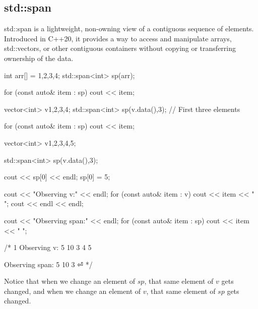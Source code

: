 \documentclass{report}
\begin{document}
         \subsection{std::span}
         \bigbreak \noindent 
         std::span is a lightweight, non-owning view of a contiguous sequence of elements. Introduced in C++20, it provides a way to access and manipulate arrays, std::vectors, or other contiguous containers without copying or transferring ownership of the data.
         \bigbreak \noindent 
         \begin{cppcode}
             int arr[] = {1,2,3,4};
             std::span<int> sp(arr);

             for (const auto& item : sp) cout << item;

             vector<int> v{1,2,3,4};
             std::span<int> sp(v.data(),3); // First three elements

             for (const auto& item : sp) cout << item;
         \end{cppcode}

         \bigbreak \noindent 
         \begin{cppcode}
             vector<int> v{1,2,3,4,5};

             std::span<int> sp(v.data(),3);

             cout << sp[0] << endl;
             sp[0] = 5;

             cout << "Observing v:" << endl;
             for (const auto& item : v) cout << item << " ";
             cout << endl << endl;

             cout << "Observing span:" << endl;
             for (const auto& item : sp) cout << item << " ";

             /*
             1
             Observing v:
             5 10 3 4 5 

             Observing span:
             5 10 3 ⏎
             */
         \end{cppcode}
         \bigbreak \noindent 
         Notice that when we change an element of $sp$, that same element of $v$ gets changed, and when we change an element of $v$, that same element of $sp$ gets changed. 

         \bigbreak \noindent 
\end{document}
